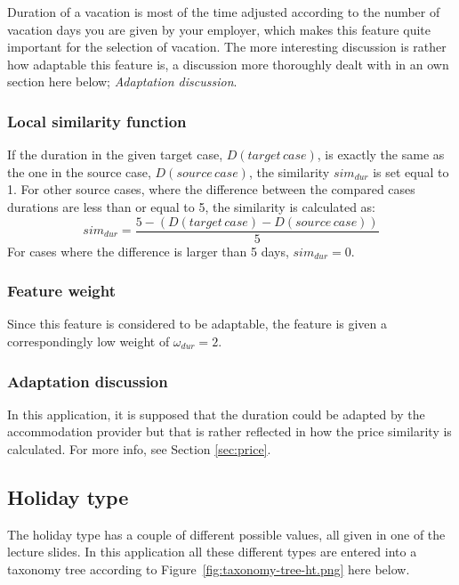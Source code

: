 \documentclass[12pt]{article}
\begin{document}
Duration of a vacation is most of the time adjusted according to the number of vacation days you are given by your employer, which makes this feature quite important for the selection of vacation. The more interesting discussion is rather how adaptable this feature is, a discussion more thoroughly dealt with in an own section here below; \textit{Adaptation discussion}.

\subsubsection{Local similarity function}
\label{sec:dur-sim}

If the duration in the given target case, $D(target\,case)$, is exactly the same as the one in the source case, $D(source\,case)$, the similarity $sim_{dur}$ is set equal to 1. For other source cases, where the difference between the compared cases durations are less than or equal to 5, the similarity is calculated as: $$sim_{dur}=\frac{5-(D(target\,case)-D(source\,case))}{5}$$
For cases where the difference is larger than 5 days, $sim_{dur}=0$.

\subsubsection{Feature weight}
\label{sec:dur-weight}

Since this feature is considered to be adaptable, the feature is given a correspondingly low weight of $\omega_{dur}=2$. 

\subsubsection{Adaptation discussion}
\label{sec:dur-adapt}

In this application, it is supposed that the duration could be adapted by the accommodation provider but that is rather reflected in how the price similarity is calculated. For more info, see Section \ref{sec:price}. 

\subsection{Holiday type}
\label{sec:ht}

The holiday type has a couple of different possible values, all given in one of the lecture slides. In this application all these different types are entered into a taxonomy tree according to Figure~\ref{fig:taxonomy-tree-ht.png} here below.
\end{document}
